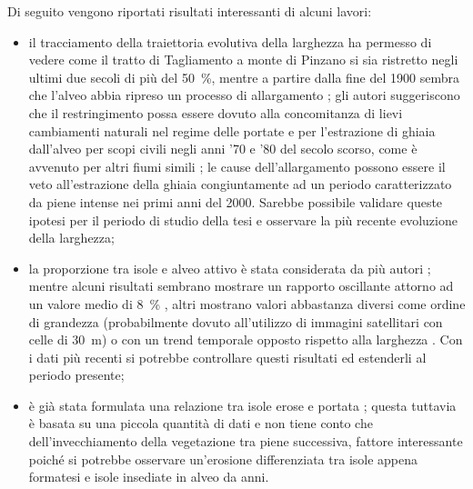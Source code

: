 Di seguito vengono riportati risultati interessanti di alcuni lavori: 
%
\begin{itemize}
	\item il tracciamento della traiettoria evolutiva della larghezza ha permesso di vedere come il tratto di Tagliamento a monte di Pinzano si sia ristretto negli ultimi due secoli di più del \SI{50}{\percent}, mentre a partire dalla fine del 1900 sembra che l'alveo abbia ripreso un processo di allargamento ;
	gli autori suggeriscono che il restringimento possa essere dovuto alla concomitanza di lievi cambiamenti naturali nel regime delle portate e per l'estrazione di ghiaia dall'alveo per scopi civili negli anni '70 e '80 del secolo scorso, come è avvenuto per altri fiumi simili ;
	le cause dell'allargamento possono essere il veto all'estrazione della ghiaia congiuntamente ad un periodo caratterizzato da piene intense nei primi anni del 2000.
	Sarebbe possibile validare queste ipotesi per il periodo di studio della tesi e osservare la più recente evoluzione della larghezza;
	\item la proporzione tra isole e alveo attivo è stata considerata da più autori ; 
	mentre alcuni risultati sembrano mostrare un rapporto oscillante attorno ad un valore medio di \SI{8}{\percent} , altri mostrano valori abbastanza diversi come ordine di grandezza  (probabilmente dovuto all'utilizzo di immagini satellitari con celle di \SI{30}{\m}) o con un trend temporale opposto rispetto alla larghezza .
	Con i dati più recenti si potrebbe controllare questi risultati ed estenderli al periodo presente;
	\item è già stata formulata una relazione tra isole erose e portata ;
	questa tuttavia è basata su una piccola quantità di dati e non tiene conto che dell'invecchiamento della vegetazione tra piene successiva, fattore interessante poiché si potrebbe osservare un'erosione differenziata tra isole appena formatesi e isole insediate in alveo da anni.
\end{itemize}


